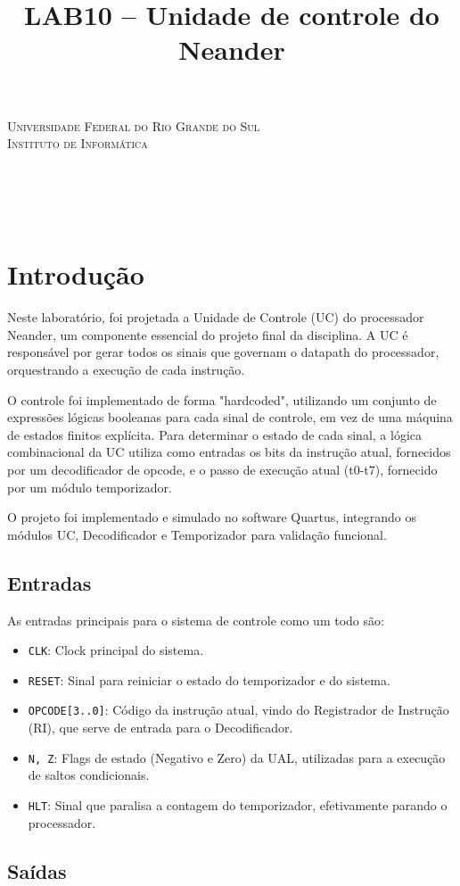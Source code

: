 \documentclass[12pt, fleqn]{article}
\title{LAB10 – Unidade de controle do Neander}
\renewcommand{\maketitle}{
    \begin{titlepage}
        \begin{center}
            {\scshape Universidade Federal do Rio Grande do Sul\\Instituto de Informática} \\
            \vspace*{\fill}
            {\large \thecourse} \\[16pt]
            {\LARGE \thetitle} \\[36pt]
            \theauthors \\
            \vspace*{\fill}
            \theprofessor \\[2pt]
            \thesemester
        \end{center}
    \end{titlepage}
}
\begin{document}
\maketitle

\section{Introdução}

Neste laboratório, foi projetada a Unidade de Controle (UC) do processador Neander, um componente essencial do projeto final da disciplina. A UC é responsável por gerar todos os sinais que governam o datapath do processador, orquestrando a execução de cada instrução.

O controle foi implementado de forma "hardcoded", utilizando um conjunto de expressões lógicas booleanas para cada sinal de controle, em vez de uma máquina de estados finitos explícita. Para determinar o estado de cada sinal, a lógica combinacional da UC utiliza como entradas os bits da instrução atual, fornecidos por um decodificador de opcode, e o passo de execução atual (t0-t7), fornecido por um módulo temporizador.

O projeto foi implementado e simulado no software Quartus, integrando os módulos UC, Decodificador e Temporizador para validação funcional.

\subsection{Entradas}

As entradas principais para o sistema de controle como um todo são:
\begin{itemize}
	\item \texttt{CLK}: Clock principal do sistema.
	\item \texttt{RESET}: Sinal para reiniciar o estado do temporizador e do sistema.
	\item \texttt{OPCODE[3..0]}: Código da instrução atual, vindo do Registrador de Instrução (RI), que serve de entrada para o Decodificador.
	\item \texttt{N, Z}: Flags de estado (Negativo e Zero) da UAL, utilizadas para a execução de saltos condicionais.
	\item \texttt{HLT}: Sinal que paralisa a contagem do temporizador, efetivamente parando o processador.
\end{itemize}

\subsection{Saídas}
\end{document}
